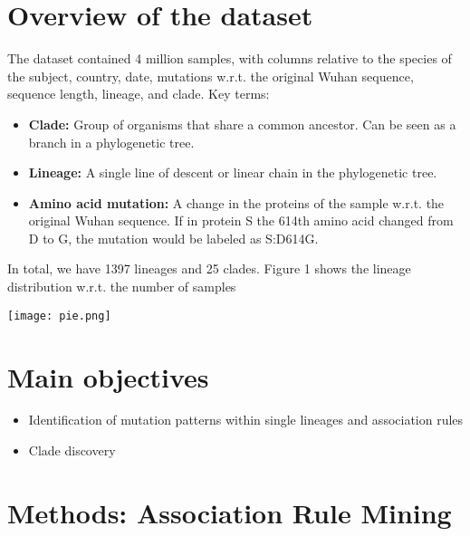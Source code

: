 \documentclass[a0,landscape]{a0poster}
\begin{document}
\begin{multicols}{4}
\section*{Overview of the dataset}
The dataset contained 4 million samples, with columns relative to the species of the subject, country, date, mutations w.r.t. the original Wuhan sequence, sequence length, lineage, and clade. Key terms:
\begin{itemize}
	\item \textbf{Clade: }Group of organisms that share a common ancestor. Can be seen as a branch in a phylogenetic tree.
	\item \textbf{Lineage: } A single line of descent or linear chain in the phylogenetic tree.
	\item \textbf{Amino acid mutation: } A change in the proteins of the sample w.r.t. the original Wuhan sequence. If in protein S the 614th amino acid changed from D to G, the mutation would be labeled as S:D614G.
\end{itemize}
In total, we have 1397 lineages and 25 clades. Figure 1 shows the lineage distribution w.r.t. the number of samples
\begin{center}\vspace{1cm}
	\texttt{[image: pie.png]}
\end{center}\vspace{1cm}
\section*{Main objectives}
\begin{itemize}
	\item Identification of mutation patterns within single lineages and association rules
	\item Clade discovery
\end{itemize}


\section*{Methods: Association Rule Mining}


\end{multicols}
\end{document}
